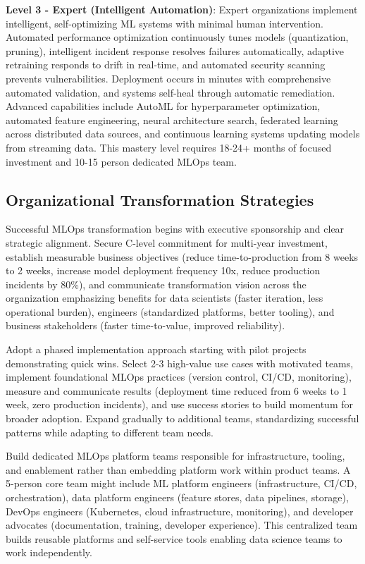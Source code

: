 \textbf{Level 3 - Expert (Intelligent Automation)}: Expert organizations implement intelligent, self-optimizing ML systems with minimal human intervention. Automated performance optimization continuously tunes models (quantization, pruning), intelligent incident response resolves failures automatically, adaptive retraining responds to drift in real-time, and automated security scanning prevents vulnerabilities. Deployment occurs in minutes with comprehensive automated validation, and systems self-heal through automatic remediation. Advanced capabilities include AutoML for hyperparameter optimization, automated feature engineering, neural architecture search, federated learning across distributed data sources, and continuous learning systems updating models from streaming data. This mastery level requires 18-24+ months of focused investment and 10-15 person dedicated MLOps team.

\subsection{Organizational Transformation Strategies}

Successful MLOps transformation begins with executive sponsorship and clear strategic alignment. Secure C-level commitment for multi-year investment, establish measurable business objectives (reduce time-to-production from 8 weeks to 2 weeks, increase model deployment frequency 10x, reduce production incidents by 80\%), and communicate transformation vision across the organization emphasizing benefits for data scientists (faster iteration, less operational burden), engineers (standardized platforms, better tooling), and business stakeholders (faster time-to-value, improved reliability).

Adopt a phased implementation approach starting with pilot projects demonstrating quick wins. Select 2-3 high-value use cases with motivated teams, implement foundational MLOps practices (version control, CI/CD, monitoring), measure and communicate results (deployment time reduced from 6 weeks to 1 week, zero production incidents), and use success stories to build momentum for broader adoption. Expand gradually to additional teams, standardizing successful patterns while adapting to different team needs.

Build dedicated MLOps platform teams responsible for infrastructure, tooling, and enablement rather than embedding platform work within product teams. A 5-person core team might include ML platform engineers (infrastructure, CI/CD, orchestration), data platform engineers (feature stores, data pipelines, storage), DevOps engineers (Kubernetes, cloud infrastructure, monitoring), and developer advocates (documentation, training, developer experience). This centralized team builds reusable platforms and self-service tools enabling data science teams to work independently.

